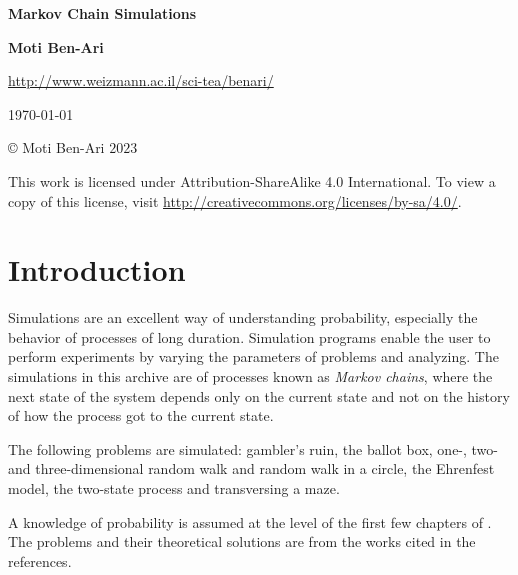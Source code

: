 \documentclass[11pt,a4paper]{article}
\begin{document}

\thispagestyle{empty}

\begin{center}
\textbf{\LARGE Markov Chain Simulations}

\bigskip
\bigskip
\bigskip

\textbf{\Large Moti Ben-Ari}

\bigskip

\url{http://www.weizmann.ac.il/sci-tea/benari/}

\bigskip
\bigskip
\bigskip

\today

\end{center}

\vfill

\begin{center}
\copyright{} Moti Ben-Ari $2023$
 \end{center}
 
\begin{small}
This work is licensed under Attribution-ShareAlike 4.0 International. To view a copy of this license, visit \url{http://creativecommons.org/licenses/by-sa/4.0/}.
\end{small}
\newpage

\tableofcontents

\newpage



\section{Introduction}

Simulations are an excellent way of understanding probability, especially the behavior of processes of long duration. Simulation programs enable the user to perform experiments by varying the parameters of problems and analyzing. The simulations in this archive are of processes known as \emph{Markov chains}, where the next state of the system depends only on the current state and not on the history of how the process got to the current state. 

The following problems are simulated: gambler's ruin, the ballot box, one-, two- and three-dimensional random walk and random walk in a circle, the Ehrenfest model, the two-state process and transversing a maze.

A knowledge of probability is assumed at the level of the first few chapters of \cite{BW,ross}. The problems and their theoretical solutions are from the works cited in the references.
\end{document}
